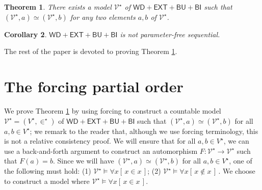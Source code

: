 \documentclass[10pt,a4paper, openany,  oldfontcommands]{memoir}
\newtheorem{theorem}{Theorem}
\newtheorem{corollary} [theorem] {Corollary}
\newtheorem{open problem} [theorem] {Open Problem}
\begin{document}
\begin{theorem}  \label{maintheorem}
There exists a model  $  \mathcal{V}^{ \star }    $    of   
 $  \mathsf{WD}  +  \mathsf{EXT}   +   \mathsf{BU}  +  \mathsf{BI}$
 such that   $  \left(   \mathcal{V}^{  \star }  ,  a   \right)   \simeq   \left(   \mathcal{V}^{  \star }  ,   b   \right)    $  
 for any two elements  $a, b $  of  $  \mathcal{V}^{  \star }  $. 
\end{theorem}







\begin{corollary}  
 $  \mathsf{WD} +   \mathsf{EXT}    +   \mathsf{BU}  +  \mathsf{BI}$ is not  parameter-free  sequential. 
\end{corollary}








   






The rest of the paper is devoted to proving  Theorem  \ref{maintheorem}. 
















\section{The forcing partial order}





We prove Theorem  \ref{maintheorem}   by using forcing to construct a countable  model
    $   \mathcal{V}^{ \star }  =    \left(   V^{  \star }   ,  \in^{  \star }  \right)       $  of  
    $   \mathsf{WD}  +   \mathsf{EXT}    +   \mathsf{BU}  +  \mathsf{BI}  $
   such that     $  \left(   \mathcal{V}^{  \star }  ,  a   \right)   \simeq   \left(   \mathcal{V}^{  \star }  ,   b   \right)    $   
   for all $ a, b  \in  V^{  \star }      $; 
   we  remark  to the reader  that, although we use forcing terminology, this is not a relative consistency proof. 
We will ensure that  for all $  a, b  \in   V^{  \star }  $, 
   we can use  a  back-and-forth argument    to construct an automorphism  $F   :    \mathcal{V}^{ \star }   \to  \mathcal{V}^{ \star }    $
 such that  $  F \left(  a  \right)  =  b  $. 
Since  we will have   $  \left(   \mathcal{V}^{  \star }  ,  a   \right)   \simeq   \left(   \mathcal{V}^{  \star }  ,   b   \right)    $     for all $ a, b  \in  V^{  \star }      $,  one of the following  must  hold: 
(1)   $  \mathcal{V}^{  \star }    \models    \forall x  \left[  \,   x  \in  x  \,   \right]   $; 
(2)   $      \mathcal{V}^{  \star }    \models     \forall x  \left[  \,   x    \not\in  x  \,   \right]      \,    $.
 We choose to  construct a model where   $   \mathcal{V}^{ \star }   \models  \forall x  \left[  \,   x  \in  x  \,   \right]        $. 
 
\end{document}
